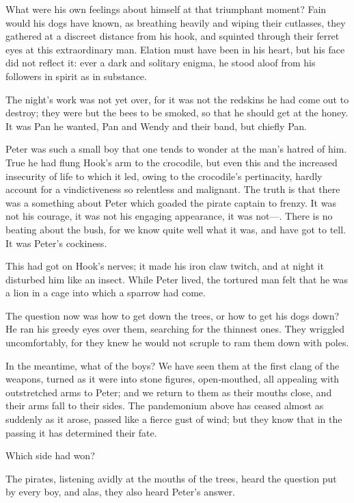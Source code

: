 What were his own feelings about himself at that triumphant moment?
Fain would his dogs have known,
as breathing heavily and wiping their cutlasses, they gathered at a discreet distance from his hook,
and squinted through their ferret eyes at this extraordinary man.
Elation must have been in his heart, but his face did not reflect it:
ever a dark and solitary enigma, he stood aloof from his followers in spirit as in substance.

The night’s work was not yet over, for it was not the redskins he had come out to destroy;
they were but the bees to be smoked, so that he should get at the honey.
It was Pan he wanted, Pan and Wendy and their band, but chiefly Pan.

Peter was such a small boy that one tends to wonder at the man’s hatred of him.
True he had flung Hook’s arm to the crocodile,
but even this and the increased insecurity of life to which it led, owing to the crocodile’s pertinacity,
hardly account for a vindictiveness so relentless and malignant.
The truth is that there was a something about Peter which goaded the pirate captain to frenzy.
It was not his courage, it was not his engaging appearance, it was not—.
There is no beating about the bush, for we know quite well what it was, and have got to tell.
It was Peter’s cockiness.

This had got on Hook’s nerves;
it made his iron claw twitch, and at night it disturbed him like an insect.
While Peter lived, the tortured man felt that he was a lion in a cage into which a sparrow had come.

The question now was how to get down the trees, or how to get his dogs down?
He ran his greedy eyes over them, searching for the thinnest ones.
They wriggled uncomfortably, for they knew he would not scruple to ram them down with poles.

In the meantime, what of the boys?
We have seen them at the first clang of the weapons, turned as it were into stone figures, open‐mouthed,
all appealing with outstretched arms to Peter;
and we return to them as their mouths close, and their arms fall to their sides.
The pandemonium above has ceased almost as suddenly as it arose, passed like a fierce gust of wind;
but they know that in the passing it has determined their fate.

Which side had won?

The pirates, listening avidly at the mouths of the trees, heard the question put by every boy,
and alas, they also heard Peter’s answer.

